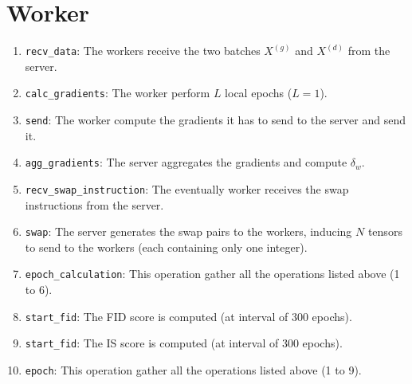 \section{Worker}
\begin{enumerate}
    \item \texttt{recv\_data}: The workers receive the two batches $X^{(g)}$ and $X^{(d)}$ from the server.
    \item \texttt{calc\_gradients}: The worker perform $L$ local epochs ($L = 1$).
    \item \texttt{send}: The worker compute the gradients it has to send to the server and send it.
    \item \texttt{agg\_gradients}: The server aggregates the gradients and compute $\delta_w$.
    \item \texttt{recv\_swap\_instruction}: The eventually worker receives the swap instructions from the server.
    \item \texttt{swap}: The server generates the swap pairs to the workers, inducing $N$ tensors to send to the workers (each containing only one integer).
    \item \texttt{epoch\_calculation}: This operation gather all the operations listed above (1 to 6).
    \item \texttt{start\_fid}: The FID score is computed (at interval of 300 epochs).
    \item \texttt{start\_fid}: The IS score is computed (at interval of 300 epochs).
    \item \texttt{epoch}: This operation gather all the operations listed above (1 to 9).
\end{enumerate}
